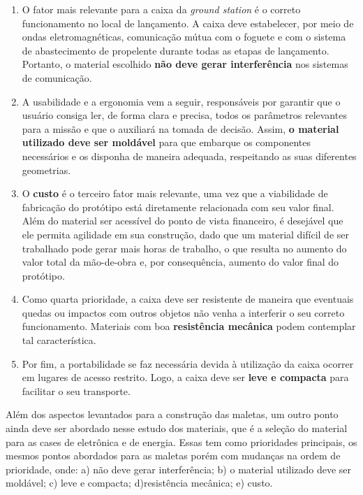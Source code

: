 \begin{enumerate}
    \item O fator mais relevante para a caixa da \textit{ground station} é o correto funcionamento no local de lançamento. A caixa deve estabelecer, por meio de ondas eletromagnéticas, comunicação mútua com o foguete e com o sistema de abastecimento de propelente durante todas as etapas de lançamento. Portanto, o material escolhido \textbf{não deve gerar interferência} nos sistemas de comunicação. 
    \item A usabilidade e a ergonomia vem a seguir, responsáveis por garantir que o usuário consiga ler, de forma clara e precisa, todos os parâmetros relevantes para a missão e que o auxiliará na tomada de decisão. Assim, \textbf{o material utilizado deve ser moldável} para que embarque os componentes necessários e os disponha de maneira adequada, respeitando as suas diferentes geometrias.
    \item O \textbf{custo} é o terceiro fator mais relevante, uma vez que a viabilidade de fabricação do protótipo está diretamente relacionada com seu valor final. Além do material ser acessível do ponto de vista financeiro, é desejável que ele permita agilidade em sua construção, dado que um material difícil de ser trabalhado pode gerar mais horas de trabalho, o que resulta no aumento do valor total da mão-de-obra e, por consequência, aumento do valor final do protótipo.
    \item Como quarta prioridade, a caixa deve ser resistente de maneira que eventuais quedas ou impactos com outros objetos não venha a interferir o seu correto funcionamento. Materiais com boa \textbf{resistência mecânica} podem contemplar tal característica.
    \item Por fim, a portabilidade se faz necessária devida à utilização da caixa ocorrer em lugares de acesso restrito. Logo, a caixa deve ser \textbf{leve e compacta} para facilitar o seu transporte.
\end{enumerate}

\par Além dos aspectos levantados para a construção das maletas, um outro ponto ainda deve ser abordado nesse estudo dos materiais, que é a seleção do material para as cases de eletrônica e de energia. Essas tem como prioridades principais, os mesmos pontos abordados para as maletas porém com mudanças na ordem de prioridade, onde: a) não deve gerar interferência; b) o material utilizado deve ser moldável; c) leve e compacta; d)resistência mecânica; e) custo.

